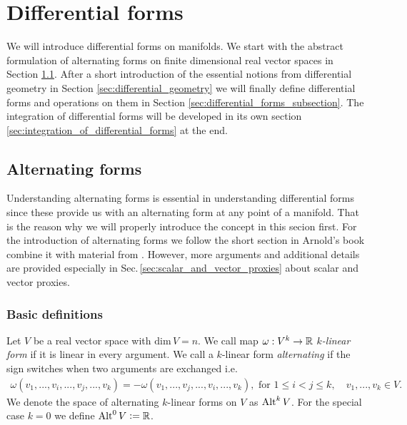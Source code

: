 \documentclass[../main.tex]{subfiles}
\begin{document}
\section{Differential forms}\label{sec:differential_forms}

We will introduce differential forms on manifolds. We start with the abstract 
formulation of alternating forms on finite dimensional real vector spaces 
in Section \ref{sec:alternating_maps}. After a short introduction of 
the essential notions from differential geometry in Section \ref{sec:differential_geometry}
we will finally define differential forms and operations on them 
in Section \ref{sec:differential_forms_subsection}. The integration 
of differential forms will be developed in its own section \ref{sec:integration_of_differential_forms} 
at the end.

\subsection{Alternating forms} \label{sec:alternating_maps}

Understanding alternating forms is essential in understanding differential forms 
since these provide us with an alternating form at any point of a manifold. 
That is the reason why we will properly introduce the concept in this 
secion first.
For the introduction of alternating forms we follow
the short section in Arnold's book
\cite[Sec. 6.1.]{arnold} combine it 
with material from \cite[Sec.\,V.1]{topology_and_geometry}.
However, more arguments and additional details are provided especially  
in Sec.\,\ref{sec:scalar_and_vector_proxies} about scalar and vector proxies.

\subsubsection{Basic definitions}

\begin{definition}
    Let $V$ be a real vector space with $\text{dim}\,V = n$.
    We call map $\omega: V^k \rightarrow \mathbb{R}$ 
    \textit{$k$-linear form} if it is linear in every argument.
    We call a $k$-linear form 
    \textit{alternating} if the sign switches when two arguments are exchanged 
    i.e.
    \begin{align*}
        \omega(v_1,...,v_i,...,v_j,...,v_k)
        = - \omega(v_1,...,v_j,...,v_i,...,v_k), \text{ for } 1\leq i < j \leq k,
        \quad v_1,...,v_k \in V.
    \end{align*}
    We denote the space of alternating $k$-linear forms on $V$ as ${\text{Alt}^{k}\,V}$.
    For the special case $k=0$ we define ${\text{Alt}^{0}\,V} \vcentcolon= \mathbb{R}$.
\end{definition}
\end{document}
